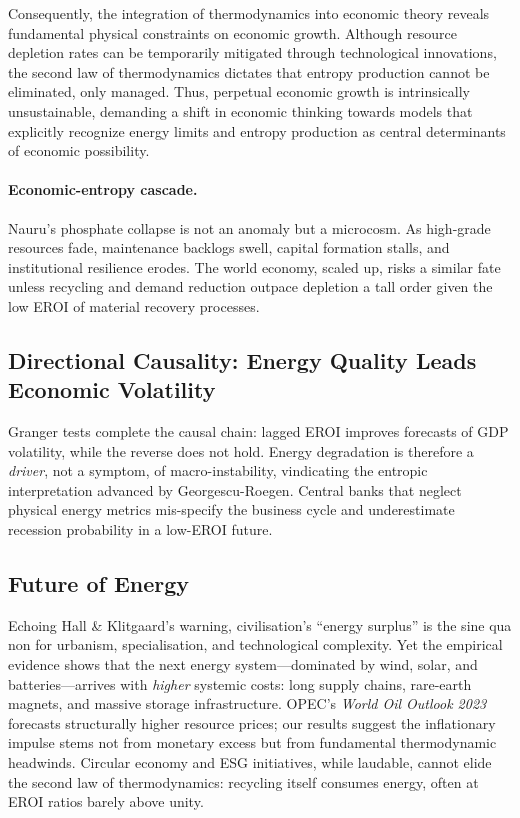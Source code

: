 \documentclass[a4paper,12pt]{article}
\begin{document}
Consequently, the integration of thermodynamics into economic theory reveals fundamental physical constraints on economic growth. Although resource depletion rates can be temporarily mitigated through technological innovations, the second law of thermodynamics dictates that entropy production cannot be eliminated, only managed. Thus, perpetual economic growth is intrinsically unsustainable, demanding a shift in economic thinking towards models that explicitly recognize energy limits and entropy production as central determinants of economic possibility.

\paragraph{Economic-entropy cascade.}
Nauru’s phosphate collapse is not an anomaly but a microcosm.  As high-grade
resources fade, maintenance backlogs swell, capital formation stalls, and
institutional resilience erodes.  The world economy, scaled up, risks a
similar fate unless recycling and demand reduction outpace depletion a tall
order given the low EROI of material recovery processes.

\subsection{Directional Causality: Energy Quality Leads Economic Volatility}
\label{sec:disc_causality}

Granger tests complete the causal chain: lagged EROI improves forecasts of GDP
volatility, while the reverse does not hold.  Energy degradation is therefore
a \emph{driver}, not a symptom, of macro-instability, vindicating the entropic
interpretation advanced by Georgescu-Roegen.  Central banks that neglect
physical energy metrics mis-specify the business cycle and underestimate
recession probability in a low-EROI future.

\subsection{Future of Energy}
\label{sec:disc_future_energy}

Echoing Hall \& Klitgaard’s warning, civilisation’s “energy surplus” is the
sine qua non for urbanism, specialisation, and technological complexity.
Yet the empirical evidence shows that the next energy system—dominated by
wind, solar, and batteries—arrives with \emph{higher} systemic costs:
long supply chains, rare-earth magnets, and massive storage infrastructure.
OPEC’s \textit{World Oil Outlook 2023} forecasts structurally higher
resource prices; our results suggest the inflationary impulse stems not from
monetary excess but from fundamental thermodynamic headwinds.  Circular
economy and ESG initiatives, while laudable, cannot elide the second law of
thermodynamics: recycling itself consumes energy, often at EROI ratios barely
above unity.
\end{document}
